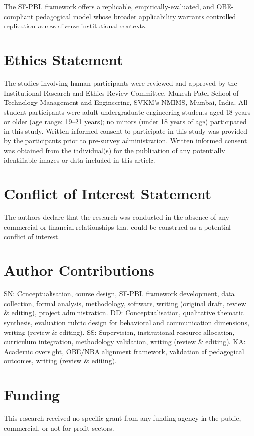 \documentclass[utf8]{FrontiersinHarvard}
\begin{document}
The SF-PBL framework offers a replicable, empirically-evaluated, and
OBE-compliant pedagogical model whose broader applicability warrants
controlled replication across diverse institutional contexts.


\section*{Ethics Statement}
The studies involving human participants were reviewed and approved by the
Institutional Research and Ethics Review Committee, Mukesh Patel School of
Technology Management and Engineering, SVKM's NMIMS, Mumbai, India. All
student participants were adult undergraduate engineering students aged 18
years or older (age range: 19--21 years); no minors (under 18 years of age)
participated in this study. Written informed consent to participate in this
study was provided by the participants prior to pre-survey administration.
Written informed consent was obtained from the individual(s) for the
publication of any potentially identifiable images or data included in this
article.

\section*{Conflict of Interest Statement}
The authors declare that the research was conducted in the absence of any
commercial or financial relationships that could be construed as a potential
conflict of interest.

\section*{Author Contributions}
SN: Conceptualisation, course design, SF-PBL framework development, data
collection, formal analysis, methodology, software, writing (original
draft, review \& editing), project administration.
DD: Conceptualisation, qualitative thematic synthesis, evaluation rubric
design for behavioral and communication dimensions, writing (review \& editing).
SS: Supervision, institutional resource allocation, curriculum integration,
methodology validation, writing (review \& editing).
KA: Academic oversight, OBE/NBA alignment framework, validation of pedagogical
outcomes, writing (review \& editing).

\section*{Funding}
This research received no specific grant from any funding agency in the
public, commercial, or not-for-profit sectors.
\end{document}
